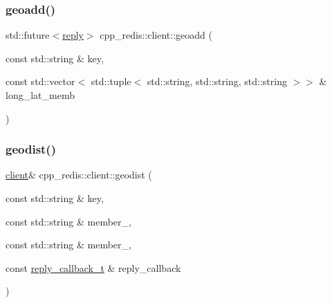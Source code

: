 \mbox{\label{classcpp__redis_1_1client_a6e4bebc3a7935bd749f2b4a6bfbb6c22}} 
\subsubsection{\texorpdfstring{geoadd()}{geoadd()}\hspace{0.1cm}{\footnotesize\ttfamily [2/2]}}
{\footnotesize\ttfamily std\+::future$<$\hyperlink{classcpp__redis_1_1reply}{reply}$>$ cpp\+\_\+redis\+::client\+::geoadd (\begin{DoxyParamCaption}\item[{const std\+::string \&}]{key,  }\item[{const std\+::vector$<$ std\+::tuple$<$ std\+::string, std\+::string, std\+::string $>$$>$ \&}]{long\+\_\+lat\+\_\+memb }\end{DoxyParamCaption})}

\mbox{\label{classcpp__redis_1_1client_a56df27bbe73c7738854150359ba39958}} 
\subsubsection{\texorpdfstring{geodist()}{geodist()}\hspace{0.1cm}{\footnotesize\ttfamily [1/3]}}
{\footnotesize\ttfamily \hyperlink{classcpp__redis_1_1client}{client}\& cpp\+\_\+redis\+::client\+::geodist (\begin{DoxyParamCaption}\item[{const std\+::string \&}]{key,  }\item[{const std\+::string \&}]{member\+\_,  }\item[{const std\+::string \&}]{member\+\_,  }\item[{const \hyperlink{classcpp__redis_1_1client_a061a1140d36d2eaeda82b09a0bb3f9f2}{reply\+\_\+callback\+\_\+t} \&}]{reply\+\_\+callback }\end{DoxyParamCaption})}

\mbox{\label{classcpp__redis_1_1client_ade755123f2de81995df6a66a363a0dfb}} 
